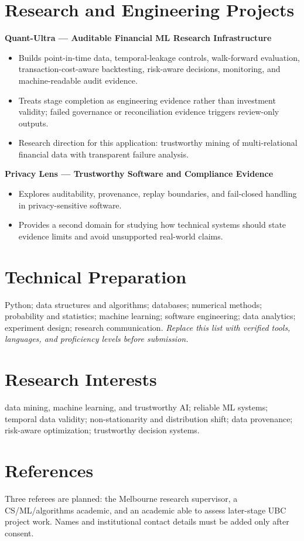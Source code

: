 \documentclass[11pt]{article}
\begin{document}
\section*{Research and Engineering Projects}
\textbf{Quant-Ultra --- Auditable Financial ML Research Infrastructure}
\begin{itemize}
\item Builds point-in-time data, temporal-leakage controls, walk-forward evaluation, transaction-cost-aware backtesting, risk-aware decisions, monitoring, and machine-readable audit evidence.
\item Treats stage completion as engineering evidence rather than investment validity; failed governance or reconciliation evidence triggers review-only outputs.
\item Research direction for this application: trustworthy mining of multi-relational financial data with transparent failure analysis.
\end{itemize}

\begin{samepage}
\textbf{Privacy Lens --- Trustworthy Software and Compliance Evidence}
\begin{itemize}
\item Explores auditability, provenance, replay boundaries, and fail-closed handling in privacy-sensitive software.
\item Provides a second domain for studying how technical systems should state evidence limits and avoid unsupported real-world claims.
\end{itemize}
\end{samepage}

\section*{Technical Preparation}
Python; data structures and algorithms; databases; numerical methods; probability and statistics; machine learning; software engineering; data analytics; experiment design; research communication. \textit{Replace this list with verified tools, languages, and proficiency levels before submission.}

\section*{Research Interests}
data mining, machine learning, and trustworthy AI; reliable ML systems; temporal data validity; non-stationarity and distribution shift; data provenance; risk-aware optimization; trustworthy decision systems.

\section*{References}
Three referees are planned: the Melbourne research supervisor, a CS/ML/algorithms academic, and an academic able to assess later-stage UBC project work. Names and institutional contact details must be added only after consent.
\end{document}
